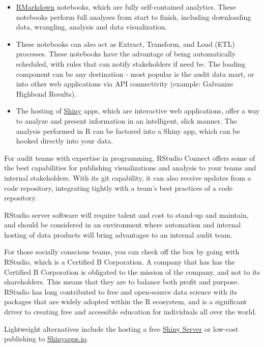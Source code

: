 \documentclass[
]{book}
\providecommand{\tightlist}{%
  \setlength{\itemsep}{0pt}\setlength{\parskip}{0pt}}
\begin{document}
\begin{itemize}
\tightlist
\item
  \href{https://rmarkdown.rstudio.com}{RMarkdown} notebooks, which are fully self-contained analytics. These notebooks perform full analyses from start to finish, including downloading data, wrangling, analysis and data visualization.
\item
  These notebooks can also act as Extract, Transform, and Load (ETL) processes. These notebooks have the advantage of being automatically scheduled, with rules that can notify stakeholders if need be. The loading component can be any destination - most popular is the audit data mart, or into other web applications via API connectivity (example: Galvanize Highbond Results).
\item
  The hosting of \href{https://shiny.rstudio.com}{Shiny} apps, which are interactive web applications, offer a way to analyze and present information in an intelligent, slick manner. The analysis performed in R can be factored into a Shiny app, which can be hooked directly into your data.
\end{itemize}

For audit teams with expertise in programming, RStudio Connect offers some of the best capabilities for publishing visualizations and analysis to your teams and internal stakeholders. With its git capability, it can also receive updates from a code repository, integrating tightly with a team's best practices of a code repository.

RStudio server software will require talent and cost to stand-up and maintain, and should be considered in an environment where automation and internal hosting of data products will bring advantages to an internal audit team.

For those socially conscious teams, you can check off the box by going with RStudio, which is a Certified B Corporation. A company that has has the Certified B Corporation is obligated to the mission of the company, and not to its shareholders. This means that they are to balance both profit and purpose. RStudio has long contributed to free and open-source data science with its packages that are widely adopted within the R ecosystem, and is a significant driver to creating free and accessible education for individuals all over the world.

Lightweight alternatives include the hosting a free \href{https://rstudio.com/products/shiny/shiny-server/}{Shiny Server} or low-cost publishing to \href{https://www.shinyapps.io}{Shinyapps.io}.
\end{document}
